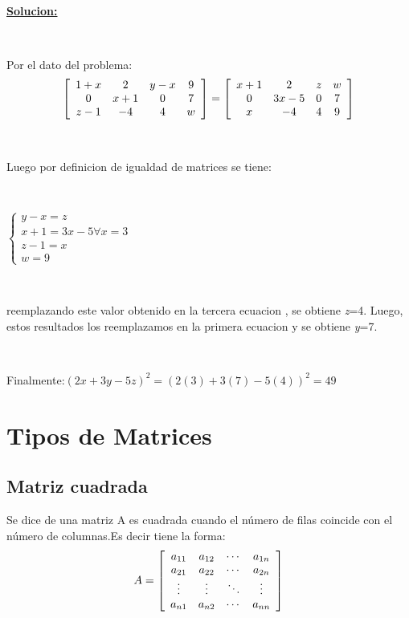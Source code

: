 \documentclass[11pt, conference]{IEEEtran}
\begin{document}
{\begin{enumerate}
\

{\bf \underline{Solucion:}}

\

Por el dato del problema:
\[ 
{\left[\begin{array}{c c c c} 1+x&2&y-x&9\\0&x+1&0&7\\z-1&-4&4&w \end{array} \right]}  = {\left[\begin{array}{c c c c} x+1&2&z&w\\0&3x-5&0&7\\x&-4&4&9 \end{array} \right]}
\]

\

Luego por definicion de igualdad de matrices se tiene:

\

$\left\{ \begin{array}{llll}
y-x=z \\
x+1=3x-5 \forall x=3\\
z-1=x\\
w=9
\end{array} \right. $

\

reemplazando este valor obtenido en la tercera ecuacion , se obtiene {\textit{z}}=4. Luego, estos resultados los reemplazamos en la primera ecuacion y se obtiene {\textit{y}}=7.

\

Finalmente:$ (2x+3y-5z)^2=(2(3)+3(7)-5(4))^2 =49$


\end{enumerate}

\section{Tipos de Matrices}
\subsection{Matriz cuadrada}
Se dice de una matriz A es cuadrada cuando el número de filas coincide con el número de columnas.Es decir tiene la forma:
\[
  A = \left[
  \begin{array}{cccc}
  a_{11} &a_{12} & \cdots & a_{1n} \\
  a_{21} &a_{22} & \cdots & a_{2n} \\
  \vdots & \vdots &\ddots & \vdots \\
  a_{n1} &a_{n2} & \cdots & a_{nn} \\
  \end{array} \right]
  \medskip
\]

}
\end{document}
